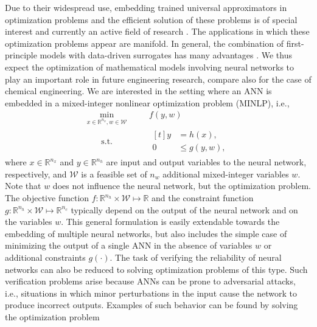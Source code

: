 %
Due to their widespread use, embedding trained universal approximators in optimization problems and the efficient solution of these problems is of special interest and currently an active field of research \citep{Schweidtmann2019a,Tong2024}. The applications in which these optimization problems appear are manifold. 
In general, the combination of first-principle models with data-driven surrogates has many advantages \citep{camps2023discovering}. We thus expect the optimization of mathematical models involving neural networks to play an important role in future engineering research, compare also \citet{Schweidtmann2021} for the case of chemical engineering.
We are interested in the setting where an ANN is embedded in a mixed-integer nonlinear optimization problem (MINLP), i.e.,
\begin{equation}\label{prob:embedded}
    \begin{alignedat}{3}
        \underset{x \in \mathbb{R}^{n_x}, w \in \mathcal{W}}\min&\ && f(y,w) \\
        \underset{\phantom{x \in \mathbb{R}^{n_x}, w \in \mathcal{W}}}{\textrm{s.t.}}&\ && \begin{aligned}[t]
            y & = h(x),\\
            0 & \leq g(y,w),
        \end{aligned}
    \end{alignedat}
\end{equation}
where $x \in \mathbb{R}^{n_x}$ and $y \in \mathbb{R}^{n_h}$ are input and output variables to the neural network, respectively, and $\mathcal{W}$ is a feasible set of $n_w$ additional mixed-integer variables $w$. Note that $w$ does not influence the neural network, but the optimization problem. The objective function $f \colon \mathbb{R}^{n_h} \times \mathcal{W} \mapsto \mathbb{R}$ and the constraint function $g \colon \mathbb{R}^{n_h} \times \mathcal{W} \mapsto \mathbb{R}^{n_c}$ typically depend on the output of the neural network and on the variables $w$. This general formulation is easily extendable towards the embedding of multiple neural networks, but also includes the simple case of minimizing the output of a single ANN in the absence of variables $w$ or additional constraints $g(\cdot)$. 
The task of verifying the reliability of neural networks can also be reduced to solving optimization problems of this type. Such verification problems arise because ANNs can be prone to adversarial attacks, i.e., situations in which minor perturbations in the input cause the network to produce incorrect outputs. Examples of such behavior can be found by solving the optimization problem 
